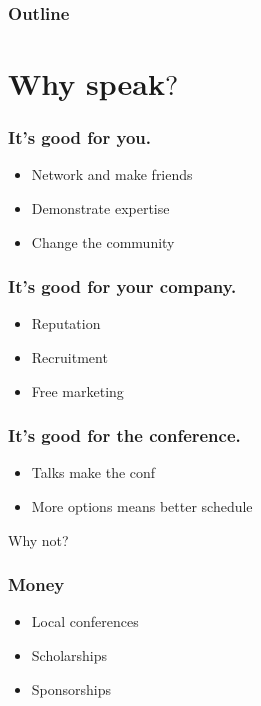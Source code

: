 \documentclass{beamer}
\begin{document}
\begin{frame}[fragile]
\frametitle{Outline}
\tableofcontents[pausesections]
\end{frame}

\section{Why speak$?$}

\begin{frame}[fragile]
\tableofcontents[currentsection]
\end{frame}

\begin{frame}[fragile]
\frametitle{It's good for you.}
\begin{itemize}[<+(1)->]
\item Network and make friends
\item Demonstrate expertise
\item Change the community
\end{itemize}
\end{frame}

\begin{frame}[fragile]
\frametitle{It's good for your company.}
\begin{itemize}[<+(1)->]
\item Reputation
\item Recruitment
\item Free marketing
\end{itemize}
\end{frame}

\begin{frame}[fragile]
\frametitle{It's good for the conference.}
\begin{itemize}[<+(1)->]
\item Talks make the conf
\item More options means better schedule
\end{itemize}
\end{frame}

\begin{frame}[fragile]
Why not?
\end{frame}


\begin{frame}[fragile]
\frametitle{Money}
\begin{itemize}[<+(1)->]
\item Local conferences
\item Scholarships
\item Sponsorships
\end{itemize}
\end{frame}
\end{document}
